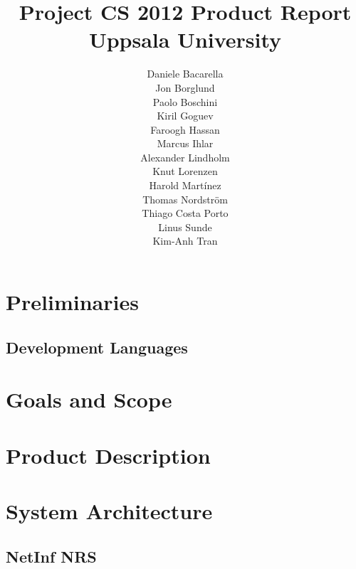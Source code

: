 \documentclass[11pt]{report}
\title{Project CS 2012 Product Report\\Uppsala University\\}
\author{Daniele Bacarella\\
		Jon Borglund\\
		Paolo Boschini\\
		Kiril Goguev\\
		Faroogh Hassan\\
		Marcus Ihlar\\
		Alexander Lindholm\\
		Knut Lorenzen\\
		Harold Mart\'{i}nez\\
		Thomas Nordstr\"om\\
		Thiago Costa Porto\\
		Linus Sunde\\
		Kim-Anh Tran
}
\date{}
\begin{document}
\maketitle




\tableofcontents



\chapter{Preliminaries}
\label{sec:preliminaries}

\section{Development Languages}


\chapter{Goals and Scope}
\label{sec:goals}



\chapter{Product Description}
\label{sec:product}





\chapter{System Architecture}
\label{sec:architecture}



\section {NetInf NRS}






\end{document}
